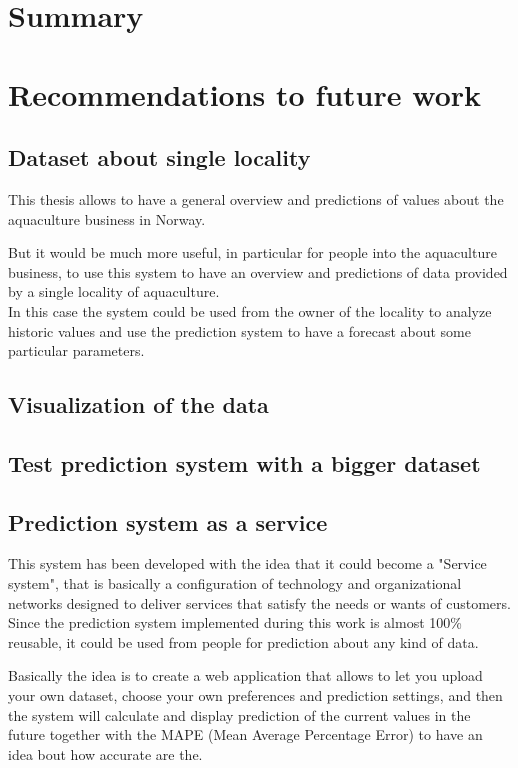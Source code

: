 
\section{Summary}

\section{Recommendations to future work}

\subsection{Dataset about single locality}
This thesis allows to have a general overview and predictions of values about the aquaculture business in Norway. 

But it would be much more useful, in particular for people into the aquaculture business, to use this system to have an overview and predictions of data provided by a single locality of aquaculture.\\
In this case the system could be used from the owner of the locality to analyze historic values and use the prediction system to have a forecast about some particular parameters.

\subsection{Visualization of the data}

\subsection{Test prediction system with a bigger dataset}

\subsection{Prediction system as a service}
This system has been developed with the idea that it could become a "Service system", that is basically a configuration of technology and organizational networks designed to deliver services that satisfy the needs or wants of customers.
Since the prediction system implemented during this work is almost 100\% reusable, it could be used from people for prediction about any kind of data. 

Basically the idea is to create a web application that allows to let you upload your own dataset, choose your own preferences and prediction settings, and then the system will calculate and display prediction of the current values in the future together with the MAPE (Mean Average Percentage Error) to have an idea bout how accurate are the.\\


